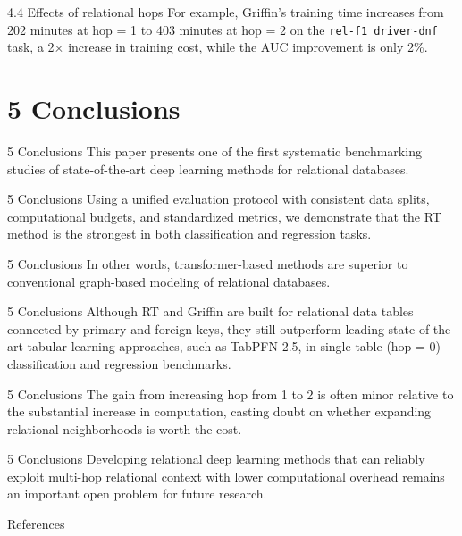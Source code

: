 \documentclass[aspectratio=169,10pt]{beamer}
\begin{document}
\begin{frame}{4.4 Effects of relational hops}
For example, Griffin's training time increases from 202 minutes at hop = 1 to 403 minutes at hop = 2 on the \texttt{rel-f1 driver-dnf} task, a 2$\times$ increase in training cost, while the AUC improvement is only 2\%.
\end{frame}

\section{5 Conclusions}

\begin{frame}{5 Conclusions}
This paper presents one of the first systematic benchmarking studies of state-of-the-art deep learning methods for relational databases.
\end{frame}

\begin{frame}{5 Conclusions}
Using a unified evaluation protocol with consistent data splits, computational budgets, and standardized metrics, we demonstrate that the RT method is the strongest in both classification and regression tasks.
\end{frame}

\begin{frame}{5 Conclusions}
In other words, transformer-based methods are superior to conventional graph-based modeling of relational databases.
\end{frame}

\begin{frame}{5 Conclusions}
Although RT and Griffin are built for relational data tables connected by primary and foreign keys, they still outperform leading state-of-the-art tabular learning approaches, such as TabPFN 2.5, in single-table (hop = 0) classification and regression benchmarks.
\end{frame}

\begin{frame}{5 Conclusions}
The gain from increasing hop from 1 to 2 is often minor relative to the substantial increase in computation, casting doubt on whether expanding relational neighborhoods is worth the cost.
\end{frame}

\begin{frame}{5 Conclusions}
Developing relational deep learning methods that can reliably exploit multi-hop relational context with lower computational overhead remains an important open problem for future research.
\end{frame}

\begin{frame}[allowframebreaks]{References}
\tiny

\end{frame}
\end{document}
